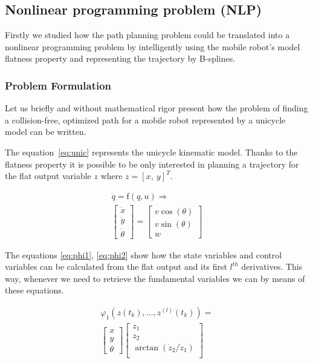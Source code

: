 \subsection{Nonlinear programming problem (NLP)}

Firstly we studied how the path planning problem could be translated into a nonlinear programming problem by intelligently using the mobile robot's model flatness property and representing the trajectory by B-splines.

\subsubsection{Problem Formulation}

Let us briefly and without mathematical rigor present how the problem of finding a collision-free, optimized path for a mobile robot represented by a unicycle model can be written.

The equation~\ref{eq:unic} represents the unicycle kinematic model. Thanks to the flatness property it is possible to be only interested in planning a trajectory for the flat output variable $z$ where $z = [x,\ y]^T$.

\begin{equation}\label{eq:unic}
\begin{array}{c}
\dot{q} = \mathrm{f}(q, u) \Rightarrow\\
\left[\begin{array}{c}
\dot{x}\\
\dot{y}\\
\dot{\theta}
\end{array}\right]=
\left[\begin{array}{c}
v\cos(\theta)\\
v\sin(\theta)\\
w
\end{array}\right]
\end{array}    
\end{equation}

The equations \ref{eq:phi1}, \ref{eq:phi2} show how the state variables and control variables can be calculated from the flat output and its first $l^{th}$ derivatives. This way, whenever we need to retrieve the fundamental variables we can by means of these equations.

\begin{equation}\label{eq:phi1}
            \begin{array}{l}
            \varphi_1(z(t_k),\dotsc,z^{(l)}(t_k))=\\
            \left[\begin{array}{c}
            x\\
            y\\
            \theta
            \end{array}\right]
            \left[\begin{array}{c}
            z_1\\
            z_2\\
            \arctan(\dot{z}_2/\dot{z}_1)\\
            \end{array}\right]
            \end{array}
\end{equation}

